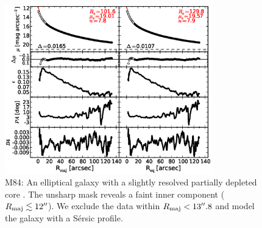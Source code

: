 \documentclass[preprint2]{emulateapj}
\newcommand{\fitfigurewidth}{0.8\textwidth}
\begin{document}
  \begin{figure}[h]
  \begin{center}
  \includegraphics[width=\fitfigurewidth]{images/m84_1Dfit.eps}
  \caption{M84:
  An elliptical galaxy with a slightly resolved partially depleted core \citep{rusli2013}. %
  The unsharp mask reveals a faint inner component ($R_{\rm maj} \lesssim 12''$). 
  We exclude the data within $R_{\rm maj} < 13''.8$ and model the galaxy with a S\'ersic profile.
  }
  \end{center}
  \end{figure}
\end{document}
